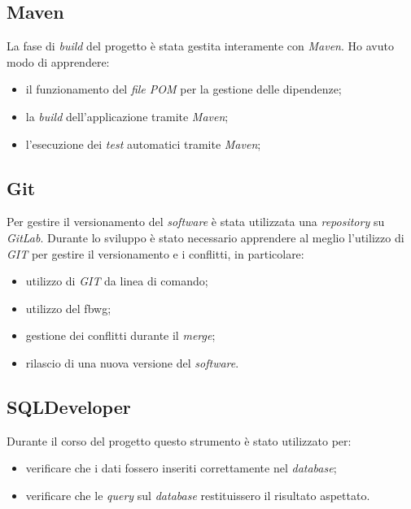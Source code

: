 \subsection{Maven}
La fase di \textit{build} del progetto è stata gestita interamente con \textit{Maven}.
Ho avuto modo di apprendere:
\begin{itemize}
    \item il funzionamento del \textit{file POM} per la gestione delle dipendenze;
    \item la \textit{build} dell'applicazione tramite \textit{Maven};
    \item l'esecuzione dei \textit{test} automatici tramite \textit{Maven};
\end{itemize}

\subsection{Git}
Per gestire il versionamento del \textit{software} è stata utilizzata una \textit{repository} su \textit{GitLab}. Durante lo sviluppo è stato necessario apprendere al meglio l'utilizzo di \textit{GIT} per gestire il versionamento e i conflitti, in particolare:
\begin{itemize}
    \item utilizzo di \textit{GIT} da linea di comando;
    \item utilizzo del \gls{fbwg}\glsfirstoccur{};
    \item gestione dei conflitti durante il \textit{merge};
    \item rilascio di una nuova versione del \textit{software}.
\end{itemize}

\subsection{SQLDeveloper}
Durante il corso del progetto questo strumento è stato utilizzato per:
\begin{itemize}
    \item verificare che i dati fossero inseriti correttamente nel \textit{database};
    \item verificare che le \textit{query} sul \textit{database} restituissero il risultato aspettato.
\end{itemize}

